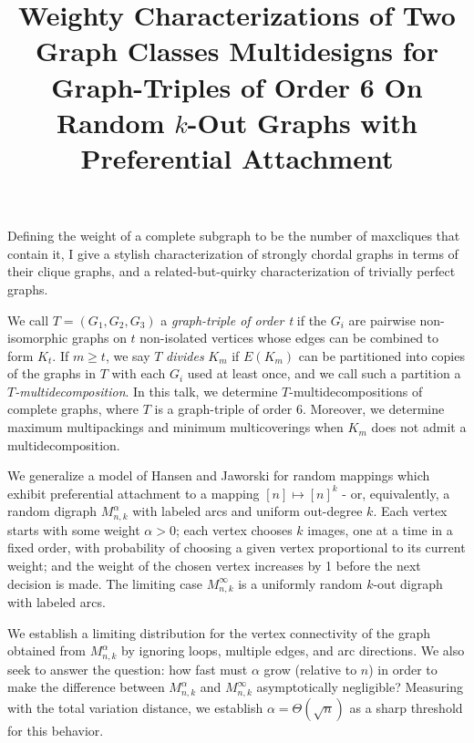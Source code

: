 \documentclass{article}
\begin{document}
\vspace{.25in}

\title{ Weighty Characterizations of Two Graph Classes}
\endtitle
Defining the weight of a complete subgraph to be the number of
maxcliques that contain it, I give a stylish characterization of strongly
chordal graphs in terms of their clique graphs, and a related-but-quirky
characterization of trivially perfect graphs. 


\vspace{.25in}

\title{ Multidesigns for Graph-Triples of Order 6 }
\endtitle
We call $T=(G_1,G_2,G_3)$ a \emph{graph-triple of order t} if the
$G_i$ are pairwise non-isomorphic graphs on $t$ non-isolated vertices whose
edges can be combined to form $K_t$.  If $m \geq t$, we say $T$
\emph{divides} $K_m$ if $E(K_m)$ can be partitioned into copies of the
graphs in $T$ with each $G_i$ used at least once, and we call such a
partition a \emph{$T$-multidecomposition}.  In this talk, we determine
$T$-multidecompositions of complete graphs, where $T$ is a graph-triple of
order 6. Moreover, we determine maximum multipackings and minimum
multicoverings when $K_m$ does not admit a multidecomposition. 


\vspace{.25in}

\title{  On Random $k$-Out Graphs with Preferential Attachment }
\endtitle
We generalize a model of Hansen and Jaworski for random mappings
which exhibit preferential attachment to a mapping $[n]\mapsto[n]^k$ - or,
equivalently, a random digraph $M_{n,k}^{\alpha}$ with labeled arcs and
uniform out-degree $k$. Each vertex starts with some weight $\alpha>0$; each
vertex chooses $k$ images, one at a time in a fixed order, with probability
of choosing a given vertex proportional to its current weight; and the
weight of the chosen vertex increases by 1 before the next decision is made.
The limiting case $M_{n,k}^{\infty}$ is a uniformly random $k$-out digraph
with labeled arcs.

We establish a limiting distribution for the vertex connectivity of the
graph obtained from $M_{n,k}^{\alpha}$ by ignoring loops, multiple edges,
and arc directions. We also seek to answer the question: how fast must
$\alpha$ grow (relative to $n$) in order to make the difference between
$M_{n,k}^{\alpha}$ and $M_{n,k}^{\infty}$ asymptotically negligible?
Measuring with the total variation distance, we establish
$\alpha=\Theta(\sqrt{n})$ as a sharp threshold for this behavior.
\end{document}

